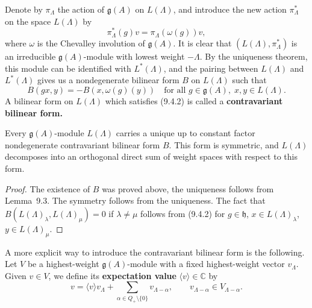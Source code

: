 \documentclass[12pt]{article}
\begin{document}
Denote by $\pi_\Lambda$ the action of $\mathfrak{g}(A)$ on $L(\Lambda)$, and introduce
the new action $\pi_\Lambda^*$ on the space $L(\Lambda)$ by
\begin{equation}
\pi_\Lambda^*(g)v = \pi_\Lambda(\omega(g))v,
\tag{9.4.1}
\end{equation}
where $\omega$ is the Chevalley involution of $\mathfrak{g}(A)$.
It is clear that $(L(\Lambda), \pi_\Lambda^*)$ is an irreducible
$\mathfrak{g}(A)$-module with lowest weight $-\Lambda$.
By the uniqueness theorem, this module can be identified with $L^*(\Lambda)$,
and the pairing between $L(\Lambda)$ and $L^*(\Lambda)$ gives us a nondegenerate
bilinear form $B$ on $L(\Lambda)$ such that
\begin{equation}
B(gx, y) = -B(x, \omega(g)(y))
\quad
\text{for all } g \in \mathfrak{g}(A),\; x,y \in L(\Lambda).
\tag{9.4.2}
\end{equation}
A bilinear form on $L(\Lambda)$ which satisfies (9.4.2) is called a 
\textbf{contravariant bilinear form.}

\begin{proposition}[9.4]
Every $\mathfrak{g}(A)$-module $L(\Lambda)$ carries a unique up to constant factor
nondegenerate contravariant bilinear form $B$. This form is symmetric, and
$L(\Lambda)$ decomposes into an orthogonal direct sum of weight spaces with respect to
this form.
\end{proposition}

\begin{proof}
The existence of $B$ was proved above, the uniqueness follows from Lemma~9.3.
The symmetry follows from the uniqueness. The fact that 
$B(L(\Lambda)_\lambda, L(\Lambda)_\mu) = 0$ if $\lambda \neq \mu$ 
follows from (9.4.2) for $g \in \mathfrak{h}$, $x \in L(\Lambda)_\lambda$, 
$y \in L(\Lambda)_\mu$.
\end{proof}

A more explicit way to introduce the contravariant bilinear form is the following.
Let $V$ be a highest-weight $\mathfrak{g}(A)$-module with a fixed highest-weight
vector $v_\Lambda$. Given $v \in V$, we define its \textbf{expectation value}
$\langle v \rangle \in \mathbb{C}$ by
\[
v = \langle v \rangle v_\Lambda + \sum_{\alpha \in Q_+ \setminus \{0\}} v_{\Lambda - \alpha},
\qquad
v_{\Lambda - \alpha} \in V_{\Lambda - \alpha}.
\]
\end{document}

